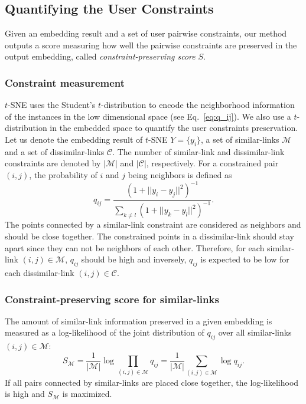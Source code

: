 \subsection{Quantifying the User Constraints}\label{subsec:s_score}
Given an embedding result and a set of user pairwise constraints, our method outputs a score measuring how well the pairwise constraints are preserved in the output embedding, called \emph{constraint-preserving score} $S$.

\subsubsection*{Constraint measurement}
$t$-SNE uses the Student's $t$-distribution to encode the neighborhood information of the instances in the low dimensional space (see Eq.~\ref{eq:q_ij}).
We also use a $t$-distribution in the embedded space to quantify the user constraints preservation.
Let us denote the embedding result of $t$-SNE ${Y} = \{{y_i}\}$, a set of similar-links $\mathcal{M}$ and a set of dissimilar-links $\mathcal{C}$. The number of similar-link and dissimilar-link constraints are denoted by $|\mathcal{M}|$ and $|\mathcal{C}|$, respectively.
For a constrained pair $(i, j)$, the probability of $i$ and $j$ being neighbors is defined as
\begin{equation}\label{equ:q_link}
    q_{ij} = \frac
    { ( 1 + || y_i - y_j ||^2 )^{-1} }
    { \sum_{k \neq l} { ( 1 + ||y_k - y_l||^2 )^{-1} } }.
\end{equation}
The points connected by a similar-link constraint are considered as neighbors and should be close together.
The constrained points in a dissimilar-link should stay apart since they can not be neighbors of each other.
Therefore, for each similar-link $(i,j) \in \mathcal{M}$, $q_{ij}$ should be high and inversely, $q_{ij}$ is expected to be low for each dissimilar-link $(i,j) \in \mathcal{C}$.

\subsubsection*{Constraint-preserving score for similar-links}
The amount of similar-link information preserved in a given embedding is measured as a log-likelihood of the joint distribution of $q_{i j}$ over all similar-links $(i, j) \in \mathcal{M}$:
\begin{equation}
S_{\mathcal{M}} = \frac{1}{|\mathcal{M}|} \log \prod_{(i,j) \in \mathcal{M}} q_{ij}
                = \frac{1}{|\mathcal{M}|} \sum_{(i,j) \in \mathcal{M}} \log q_{ij}.
\end{equation}
If all pairs connected by similar-links are placed close together, the log-likelihood is high and $S_{\mathcal{M}}$ is maximized.

